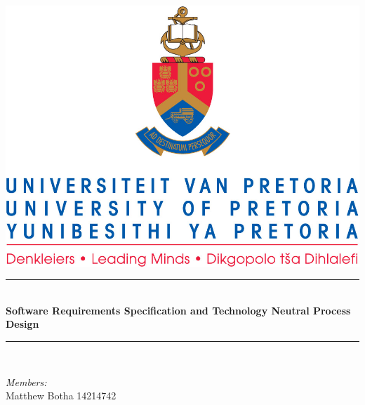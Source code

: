 \documentclass{article}
\begin{document}
	
\begin{titlepage}
	\newcommand{\HRule}{\rule{\linewidth}{0.5mm}} %

	\center %
	 

	\includegraphics[width=\textwidth]{front-page}


	\HRule \\[0.4cm]
	{ \huge \bfseries Software Requirements Specification
	and
	Technology Neutral Process Design}\\[0.4cm] %
	\HRule \\[1.5cm]
	 

	\begin{minipage}{0.5\textwidth}
	\begin{flushleft} \large
	\emph{Members:}\\%
	Matthew Botha 14214742


\end{flushleft}
\end{minipage}
\end{titlepage}
\end{document}
